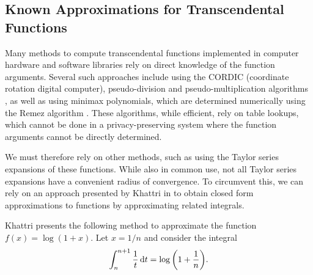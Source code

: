 \subsection{Known Approximations for Transcendental Functions}
Many methods to compute transcendental functions implemented in computer hardware and software libraries rely on direct knowledge of the function arguments. Several such approaches include using the CORDIC (coordinate rotation digital computer), pseudo-division and pseudo-multiplication algorithms \cite{walther_cordic_2000}, as well as using minimax polynomials, which are determined numerically using the Remez algorithm \cite{harrison_computation_1999}. These algorithms, while efficient, rely on table lookups, which cannot be done in a privacy-preserving system where the function arguments cannot be directly determined.

We must therefore rely on other methods, such as using the Taylor series expansions of these functions. While also in common use, not all Taylor series expansions have a convenient radius of convergence. To circumvent this, we can rely on an approach presented by Khattri in \cite{khattri_new_2009} to obtain closed form approximations to functions by approximating related integrals.

Khattri presents the following method to approximate the function $f(x)=\log(1+x)$.
Let $x = 1/n$ and consider the integral
\begin{align}
	\label{eq:log_integral}
	\int_{n}^{n+1}{\frac{1}{t}\mathop{}\!\mathrm{d} t}=\log{\left(1+\frac{1}{n}\right)}.
\end{align}

